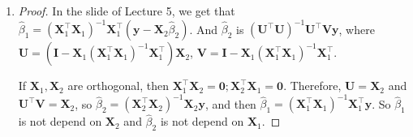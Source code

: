 \documentclass[12pt]{article}
\newcommand{\ttt}[1]{\textbf{#1}}
\begin{document}
\begin{enumerate}
    \item 
    \begin{proof}
        In the slide of Lecture 5, we get that $\hat{\beta}_1 = (\ttt{X}_1^\top \ttt{X}_1)^{-1} \ttt{X}_1^\top (\ttt{y} - \ttt{X}_2 \hat{\beta}_2)$. 
        And $\hat{\beta}_2$ is $(\ttt{U}^\top \ttt{U})^{-1} \ttt{U}^\top \ttt{V} \ttt{y}$, where $\ttt{U} = (\ttt{I} - \ttt{X}_1(\ttt{X}_1^\top \ttt{X}_1)^{-1} \ttt{X}_1^\top) \ttt{X}_2$, $\ttt{V} = \ttt{I} - \ttt{X}_1(\ttt{X}_1^\top \ttt{X}_1)^{-1} \ttt{X}_1^\top$.

        If $\ttt{X}_1, \ttt{X}_2$ are orthogonal, then $\ttt{X}_1^\top \ttt{X}_2 = \ttt{0}; \ttt{X}_2^\top \ttt{X}_1 = \ttt{0}$.
        Therefore, $\ttt{U} = \ttt{X}_2$ and $\ttt{U}^\top \ttt{V} = \ttt{X}_2$, so $\hat{\beta}_2 = (\ttt{X}_2^\top \ttt{X}_2)^{-1} \ttt{X}_2 \ttt{y}$, and then $\hat{\beta}_1 = (\ttt{X}_1^\top \ttt{X}_1)^{-1} \ttt{X}_1^\top \ttt{y}$.
        So $\hat{\beta}_1$ is not depend on $\ttt{X}_2$ and $\hat{\beta}_2$ is not depend on $\ttt{X}_1$. 
    \end{proof}
    

\end{enumerate}
\end{document}
